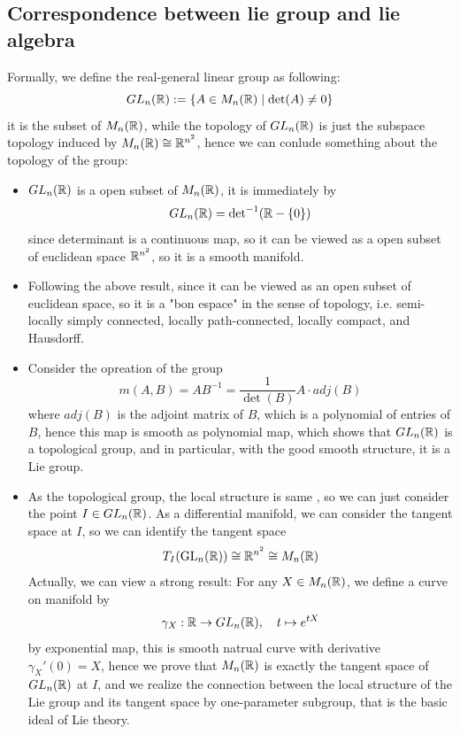 \subsection{Correspondence between lie group and lie algebra}
Formally, we define the real-general linear group as following:
\[GL_n(\mathbb{R}) : = \{A \in M_n(\mathbb{R}) \mid \det(A) \neq 0\}\]
it is the subset of \(M_n(\mathbb{R})\), while the topology of \(GL_n(\mathbb{R})\) is just the subspace topology induced by \(M_n(\mathbb{R}) \cong \mathbb{R}^{n^2}\), hence we can conlude something about the topology of the group:

\begin{itemize}
    \item \(GL_n(\mathbb{R})\) is a open subset of \(M_n(\mathbb{R})\), it is immediately by
    \[GL_n(\mathbb{R}) = \mathrm{det}^{-1}(\mathbb{R}-\{0\})\]
    since determinant is a continuous map, so it can be viewed as a open subset of euclidean space \(\mathbb{R}^{n^2}\), so it is a smooth manifold.
    \item Following the above result, since it can be viewed as an open subset of euclidean space, so it is a "bon espace" in the sense of topology, i.e. semi-locally simply connected, locally path-connected, locally compact, and Hausdorff.
    \item Consider the opreation of the group
    \[m(A,B) = AB^{-1} = \frac{1}{\det(B)}A\cdot adj(B)\]
    where \(adj(B)\) is the adjoint matrix of \(B\), which is a polynomial of entries of \(B\), hence this map is smooth as polynomial map, which shows that \(GL_n(\mathbb{R})\) is a topological group, and in particular, with the good smooth structure, it is a Lie group.
    \item As the topological group, the local structure is same , so we can just consider the point \(I \in GL_n(\mathbb{R})\). As a differential manifold, we can consider the tangent space at \(I\), so we can identify the tangent space
    \[T_I(\mathrm{GL}_n(\mathbb{R})) \cong \mathbb{R}^{n^2} \cong M_n(\mathbb{R})\]
    Actually, we can view a strong result: For any \(X \in M_n(\mathbb{R})\), we define a curve on manifold by \[\gamma_X: \mathbb{R} \to GL_n(\mathbb{R}), \quad t \mapsto e^{tX}\]
    by exponential map, this is smooth natrual curve with derivative \(\gamma_X'(0) = X\), hence we prove that \(M_n(\mathbb{R})\) is exactly the tangent space of \(GL_n(\mathbb{R})\) at \(I\), and we realize the connection between the local structure of the Lie group and its tangent space by one-parameter subgroup, that is the basic ideal of Lie theory.
\end{itemize}

